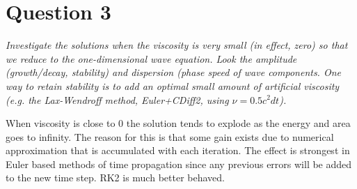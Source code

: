 \section*{Question 3}
\emph{Investigate the solutions when the viscosity is very small (in effect, zero) so that we reduce to the one-dimensional wave equation. Look the amplitude (growth/decay, stability) and dispersion (phase speed of wave components. One way to retain stability is to add an optimal small amount of artificial viscosity (e.g. the Lax-Wendroff method, Euler+CDiff2, using $\nu = 0.5 c^2 dt$).}

When viscosity is close to $0$ the solution tends to explode as the energy and area goes to infinity. The reason for this is that some gain exists due to numerical approximation that is accumulated with each iteration. The effect is strongest in Euler based methods of time propagation since any previous errors will be added to the new time step. RK2 is much better behaved.